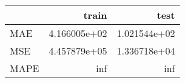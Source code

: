 \begin{tabular}{lrr}
\toprule
{} &         train &          test \\
\midrule
MAE  &  4.166005e+02 &  1.021544e+02 \\
MSE  &  4.457879e+05 &  1.336718e+04 \\
MAPE &           inf &           inf \\
\bottomrule
\end{tabular}
